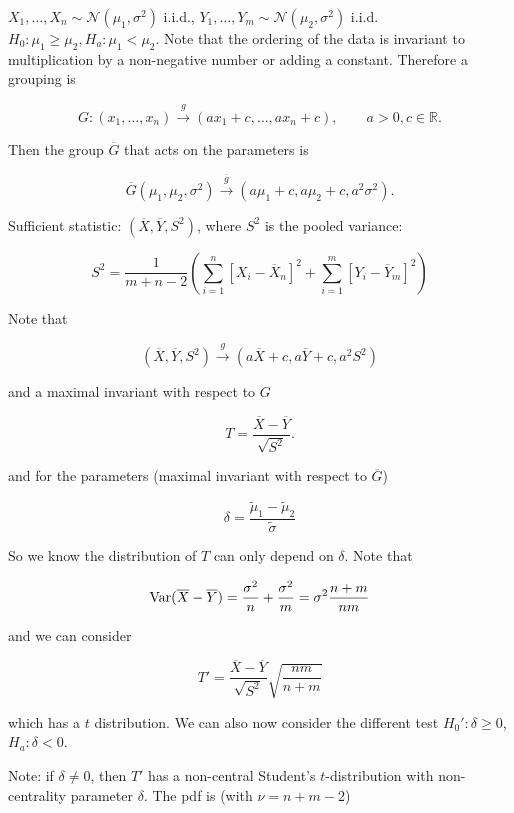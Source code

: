 \begin{example}

\(X_1, \ldots, X_n \sim \mathcal{N}(\mu_1, \sigma^2)\) i.i.d., \(Y_1, \ldots, Y_m \sim \mathcal{N}(\mu_2, \sigma^2)\) i.i.d. \(H_0: \mu_1 \geq \mu_2, H_a: \mu_1 < \mu_2\). Note that the ordering of the data is invariant to multiplication by a non-negative number or adding a constant. Therefore a grouping is 

\[
G: (x_1, \ldots, x_n) \xrightarrow{g} (a x_1 + c, \ldots, a x_n + c), \qquad a > 0, c \in \mathbb{R}.
\]

Then the group \(\overline{G}\) that acts on the parameters is 

\[
\overline{G}(\mu_1, \mu_2, \sigma^2) \xrightarrow{\overline{g}} (a \mu_1 + c, a \mu_2 + c, a^2 \sigma^2).
\]

Sufficient statistic: \((\overline{X}, \overline{Y}, S^2)\), where \(S^2\) is the pooled variance:

\[
S^2 = \frac{1}{m+n-2} \left( \sum_{i=1}^n [X_i - \overline{X}_n]^2 + \sum_{i=1}^m[Y_i - \overline{Y}_m]^2 \right)
\]

Note that 

\[
(\overline{X}, \overline{Y}, S^2) \xrightarrow{g} (a\overline{X} + c, a\overline{Y} + c, a^2S^2)
\]

and a maximal invariant with respect to \(G\)

\[
T = \frac{\overline{X} - \overline{Y}}{\sqrt{S^2}}.
\]

and for the parameters (maximal invariant with respect to \(\overline{G}\))

\[
\delta = \frac{\tilde{\mu}_1 - \tilde{\mu}_2}{\tilde{\sigma}}
\]

So we know the distribution of \(T\) can only depend on \(\delta\). Note that 

\[
\Var (\overline{X} - \overline{Y}) = \frac{\sigma^2}{n} + \frac{\sigma^2}{m} =  \sigma^2 \frac{n + m}{nm}
\]

and we can consider

\[
T' = \frac{ \overline{X} - \overline{Y}}{\sqrt{S^2}} \sqrt{\frac{nm}{n+m}}
\]

which has a \(t\) distribution. We can also now consider the different test \(H_0': \delta \geq 0\), \(H_a: \delta < 0\). 

Note: if \(\delta \neq 0\), then \(T'\) has a non-central Student's \(t\)-distribution with non-centrality parameter \(\delta\). The pdf is (with \(\nu = n+m-2\))


\end{example}
